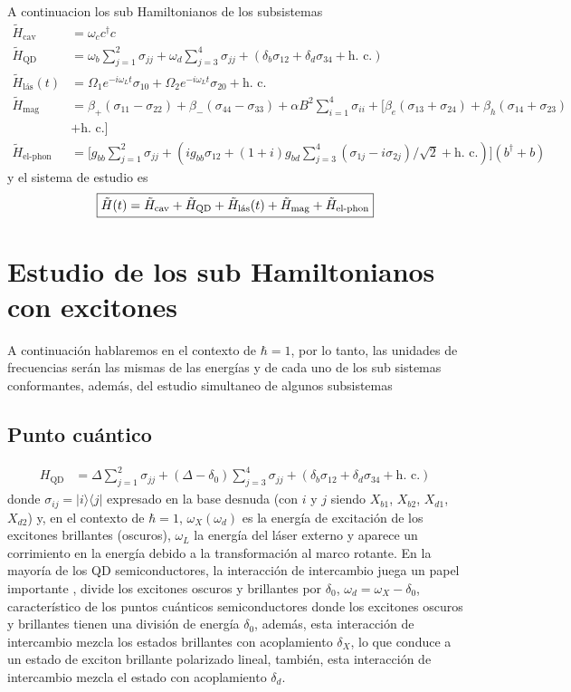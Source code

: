 \documentclass[../main.tex]{subfiles}
\begin{document}
A continuacion los sub Hamiltonianos de los subsistemas
\begin{align}
    \tilde{H}_\text{cav} &= \omega_c c^\dagger c\\
    \tilde{H}_\text{QD} &= \omega_b \sum_{j=1}^{2}\sigma_{jj} + \omega_d \sum_{j=3}^{4}\sigma_{jj} + (\delta_b\sigma_{12} + \delta_d\sigma_{34} + \text{h. c.})\\
    \tilde{H}_\text{l\'as}(t) &= \Omega_1 e^{-i\omega_L t} \sigma_{10} + \Omega_2 e^{-i\omega_L t} \sigma_{20} + \text{h. c.}\\
    \tilde{H}_\text{mag} &= \beta_+ (\sigma_{11} - \sigma_{22}) + \beta_- (\sigma_{44} - \sigma_{33}) + \alpha B^2 \sum_{i = 1}^{4} \sigma_{ii} + [\beta_e (\sigma_{13} + \sigma_{24}) + \beta_h (\sigma_{14} + \sigma_{23})\\
    &+ \text{h. c.}]\\
    \tilde{H}_\text{el-phon} &= \big[ g_{bb} \sum_{j=1}^2 \sigma_{jj} + (ig_{bb}\sigma_{12} + (1+i) g_{bd} \sum_{j=3}^4 (\sigma_{1j} - i\sigma_{2j})/\sqrt{2} + \text{h. c.}) \big](b^\dagger + b)
\end{align}
y el sistema de estudio es
\[
\fbox{$\tilde{H}(t) = \tilde{H}_\text{cav} + \tilde{H}_\text{QD} + \tilde{H}_\text{l\'as}(t) + \tilde{H}_\text{mag} + \tilde{H}_\text{el-phon}$}
\]
\chapter{Estudio de los sub Hamiltonianos con excitones}
A continuación hablaremos en el contexto de $\hbar=1$, por lo tanto, las unidades de frecuencias serán las mismas de las energías y de cada uno de los sub sistemas conformantes, además, del estudio simultaneo de algunos subsistemas 
\section{Punto cuántico}
\begin{align*}
    H_\text{QD} &=  \Delta \sum_{j=1}^{2}\sigma_{jj} + (\Delta - \delta_0) \sum_{j=3}^{4}\sigma_{jj} + (\delta_b\sigma_{12} + \delta_d\sigma_{34} + \text{h. c.})
\end{align*}
donde $\sigma_{ij} =|i\rangle\langle j|$ expresado en la base desnuda (con $i$ y $j$ siendo $X_{b1}$, $X_{b2}$, $X_{d1}$, $X_{d2}$) y, en el contexto de $\hbar = 1$, $\omega_X(\omega_d)$ es la energía de excitación de los excitones brillantes (oscuros), $\omega_L$ la energía del láser externo y aparece un corrimiento en la energía debido a la transformación al marco rotante. En la mayoría de los QD semiconductores, la interacción de intercambio juega un papel importante \parencite{Bayer2002}, divide los excitones oscuros y brillantes por $\delta_0$,  $\omega_d = \omega_X -\delta_0$, característico de los puntos cuánticos semiconductores donde los excitones oscuros y brillantes tienen una división de energía $\delta_0$, además, esta interacción de intercambio mezcla los estados brillantes con acoplamiento $\delta_X$, lo que conduce a un estado de exciton brillante polarizado lineal, también, esta interacción de intercambio mezcla el estado con acoplamiento $\delta_d$. 
\end{document}
